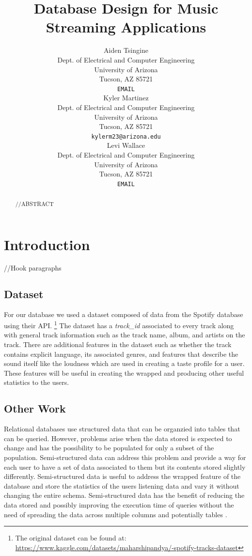 \documentclass{article}
\title{Database Design for Music Streaming Applications}
\author{%
  Aiden Tsingine \\
  Dept. of Electrical and Computer Engineering\\
  University of Arizona\\
 Tucson, AZ  85721\\
  \texttt{EMAIL} \\
  \And
  Kyler Martinez \\
  Dept. of Electrical and Computer Engineering\\
  University of Arizona\\
 Tucson, AZ  85721\\
  \texttt{kylerm23@arizona.edu} \\
   \And
  Levi Wallace \\
  Dept. of Electrical and Computer Engineering\\
  University of Arizona\\
 Tucson, AZ  85721\\
  \texttt{EMAIL} \\
}
\begin{document}
\maketitle

\begin{abstract}
//ABSTRACT
\end{abstract}

\section{Introduction}
//Hook paragraphs


\subsection{Dataset}
For our database we used a dataset composed of data from the Spotify database using their API. \footnote{The original dataset can be found at: \url{https://www.kaggle.com/datasets/maharshipandya/-spotify-tracks-dataset}} The dataset has a \textit{track\_id} associated to every track along with general track information such as the track name, album, and artists on the track. There are additional features in the dataset such as whether the track contains explicit language, its  associated genres, and features that describe the sound itself like the loudness which are used in creating a taste profile for a user. These features will be useful in creating the wrapped and producing other useful statistics to the users.

\subsection{Other Work}
Relational databases use structured data that can be organzied into tables that can be queried. However, problems arise when the data stored is expected to change and has the possibility to be populated for only a subset of the population. Semi-structured data can address this problem and provide a way for each user to have a set of data associated to them but its contents stored slightly differently. Semi-structured data is useful to address the wrapped feature of the database and store the statistics of the users listening data and vary it without changing the entire schema. Semi-structured data has the benefit of reducing the data stored and possibly improving the execution time of queries without the need of spreading the data across multiple columns and potentially tables \cite{eldahshan2022}.
\end{document}
